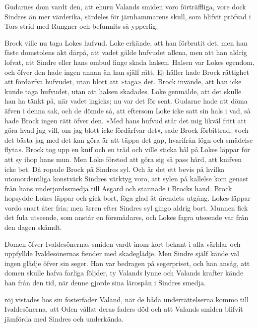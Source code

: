 Gudarnes dom vardt den, att ehuru Valands smiden voro förträffliga, vore
dock Sindres än mer värderika, särdeles för järnhammarens skull, som
blifvit pröfvad i Tors strid med Rungner och befunnits så ypperlig.

Brock ville nu taga Lokes hufvud. Loke erkände, att han förbrutit det,
men han fäste domstolens akt därpå, att vadet gälde hufvudet allena, men
att han aldrig lofvat, att Sindre eller hans ombud finge skada halsen.
Halsen var Lokes egendom, och öfver den hade ingen annan än han själf
rätt. Ej häller hade Brock rättighet att fördärfva hufvudet, utan blott
att »taga» det. Brock invände, att han icke kunde taga hufvudet, utan
att halsen skadades. Loke genmälde, att det skulle han ha tänkt på, när
vadet ingicks; nu var det för sent. Gudarne hade att döma äfven i denna
sak, och de dömde så, att eftersom Loke icke satt sin hals i vad, så
hade Brock ingen rätt öfver den. »Med hans hufvud står det mig likväl
fritt att göra hvad jag vill, om jag blott icke fördärfvar det», sade
Brock förbittrad; »och det bästa jag med det kan göra är att täppa det
gap, hvarifrån lögn och smädelse flyta». Brock tog upp en knif och en
tråd och ville sticka hål på Lokes läppar för att sy ihop hans mun. Men
Loke förstod att göra sig så pass hård, att knifven icke bet. Då ropade
Brock på Sindres syl. Och är det ett bevis på hvilka utomordentliga
konstvärk Sindres värktyg voro, att sylen på kallelse kom genast från
hans underjordssmedja till Asgard och stannade i Brocks hand. Brock
hopsydde Lokes läppar och gick bort, föga glad åt ärendets utgång. Lokes
läppar vordo snart åter fria; men ärren efter Sindres
syl gingo aldrig bort. Munnen fick det fula utseende, som anstår en
försmädares, och Lokes fagra utseende var från den dagen skämdt.

Domen öfver Ivaldesönernas smiden vardt inom kort bekant i alla världar
och uppfyllde Ivaldesönernas fiender med skadeglädje. Men Sindre själf
kände väl ingen glädje öfver sin seger. Han var bedragen på segerpriset,
och han ansåg, att domen skulle hafva farliga följder, ty Valands lynne
och Valands krafter kände han från den tid, när denne gjorde sina
lärospån i Sindres smedja.

\endSecII


\dropcapF röj vistades hos sin fosterfader Valand, när de båda underrättelserna
kommo till Ivaldesönerna, att Oden vållat deras faders död och att
Valands smiden blifvit jämförda med Sindres och underkända.

